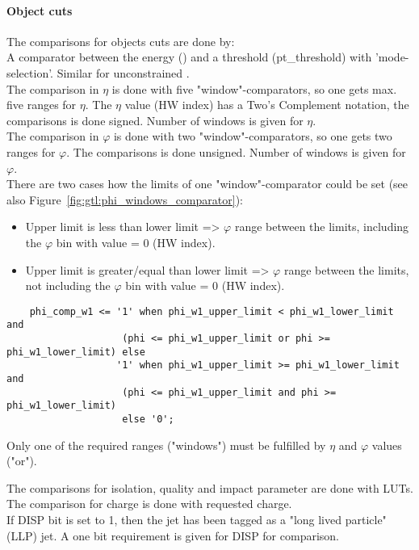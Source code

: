 \paragraph{Object cuts}
\label{sec:gtl:object_cuts}
The comparisons for objects cuts are done by:\\
A comparator between the energy (\pt) and a threshold (pt\_threshold) with 'mode-selection'. Similar for unconstrained \pt.\\
The comparison in $\eta$ is done with five "window"-comparators, so one gets max. five ranges for $\eta$. The $\eta$ value (HW index) has a Two's Complement notation, the comparisons is done signed. Number of windows is given for $\eta$.\\
The comparison in $\varphi$ is done with two "window"-comparators, so one gets two ranges for $\varphi$. The comparisons is done unsigned. Number of windows is given for $\varphi$.\\
There are two cases how the limits of one "window"-comparator could be set (see also Figure~\ref{fig:gtl:phi_windows_comparator}):
\begin{itemize}
\item Upper limit is less than lower limit => $\varphi$ range between the limits, including the $\varphi$ bin with value = 0 (HW index).
\item Upper limit is greater/equal than lower limit => $\varphi$ range between the limits, not including the $\varphi$ bin with value = 0 (HW index).
\end{itemize}
\begin{lstlisting}
    phi_comp_w1 <= '1' when phi_w1_upper_limit < phi_w1_lower_limit and
                    (phi <= phi_w1_upper_limit or phi >= phi_w1_lower_limit) else
                   '1' when phi_w1_upper_limit >= phi_w1_lower_limit and
                    (phi <= phi_w1_upper_limit and phi >= phi_w1_lower_limit)
                    else '0';
\end{lstlisting}
Only one of the required ranges ("windows") must be fulfilled by $\eta$ and $\varphi$ values ("or").\\

\clearpage

The comparisons for isolation, quality and impact parameter are done with LUTs.\\
The comparison for charge is done with requested charge.\\
If DISP bit is set to 1, then the jet has been tagged as a "long lived particle" (LLP) jet. A one bit requirement is given for DISP for comparison.\\

